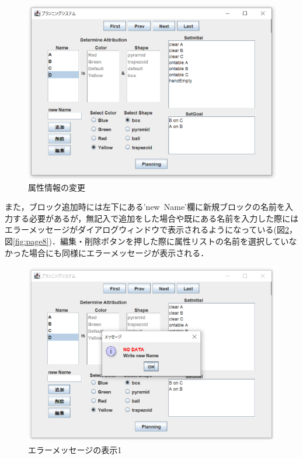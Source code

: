 \documentclass[uplatex,12pt]{jsarticle}
\begin{document}
\begin{figure}[htbp]
  \begin{center}
    \includegraphics[scale=0.6]{images/page6.PNG}
    \caption{属性情報の変更}
    \label{fig:page6}
  \end{center}
\end{figure}
また，ブロック追加時には左下にある'new\ Name'欄に新規ブロックの名前を入力する必要があるが，無記入で追加をした場合や既にある名前を入力した際にはエラーメッセージがダイアログウィンドウで表示されるようになっている(図\ref{fig:page7}，図\ref{fig:page8})．編集・削除ボタンを押した際に属性リストの名前を選択していなかった場合にも同様にエラーメッセージが表示される．\\
\begin{figure}[htbp]
  \begin{center}
    \includegraphics[scale=0.6]{images/page7.PNG}
    \caption{エラーメッセージの表示1}
    \label{fig:page7}
  \end{center}
\end{figure}
\end{document}
